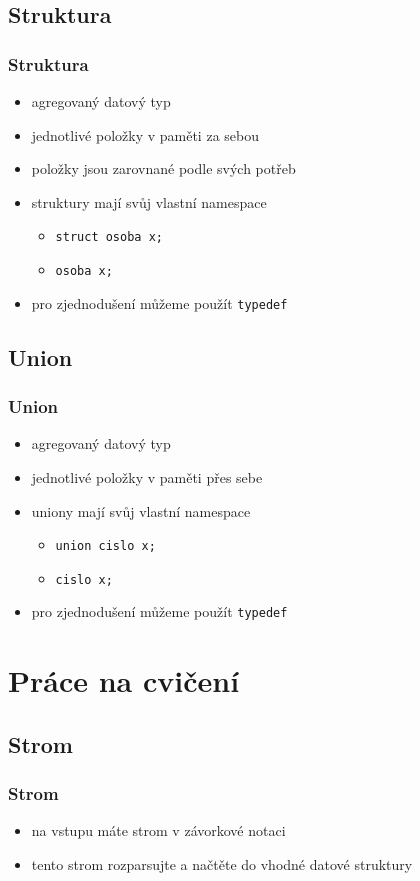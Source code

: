 \subsection{Struktura}
\begin{frame}
	\frametitle{Struktura}
	\begin{itemize}
		\item{agregovaný datový typ}
		\item{jednotlivé položky v paměti za sebou}
		\item{položky jsou zarovnané podle svých potřeb}\pause
		\item{struktury mají svůj vlastní namespace}
		\begin{itemize}
			\item \texttt{struct osoba x;}
			\item \texttt{osoba x;}
		\end{itemize}
		\item{pro zjednodušení můžeme použít \texttt{typedef}}
	\end{itemize}
\end{frame}

\subsection{Union}
\begin{frame}
	\frametitle{Union}
	\begin{itemize}
		\item{agregovaný datový typ}
		\item{jednotlivé položky v paměti přes sebe}\pause
		\item{uniony mají svůj vlastní namespace}
		\begin{itemize}
			\item \texttt{union cislo x;}
			\item \texttt{cislo x;}
		\end{itemize}
		\item{pro zjednodušení můžeme použít \texttt{typedef}}
	\end{itemize}
\end{frame}

\section{Práce na cvičení}
\subsection{Strom}

\begin{frame}
	\frametitle{Strom}
	\begin{itemize}
		\item{na vstupu máte strom v závorkové notaci}
		\item{tento strom rozparsujte a načtěte do vhodné datové struktury}
	\end{itemize}
\end{frame}




